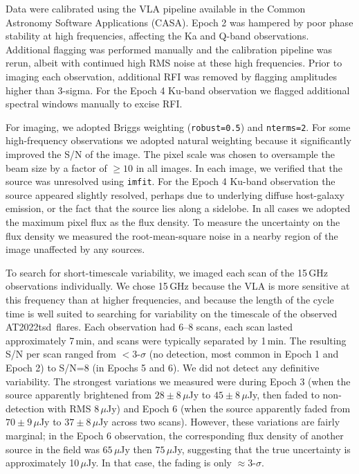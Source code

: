 \documentclass{nature_plusfigure}
\newcommand{\at}{AT2022tsd}
\begin{document}
\begin{methods}
Data were calibrated using the VLA pipeline available in the Common Astronomy Software Applications (CASA\cite{McMullin2007}).
Epoch 2 was hampered by poor phase stability at high frequencies, affecting the Ka and Q-band observations. Additional flagging was performed manually and the calibration pipeline was rerun, albeit with continued high RMS noise at these high frequencies.
Prior to imaging each observation, additional RFI was removed by flagging amplitudes higher than 3-sigma.
For the Epoch 4 Ku-band observation we flagged additional spectral windows manually to excise RFI.

For imaging, we adopted Briggs weighting (\texttt{robust=0.5}) and \texttt{nterms=2}. For some high-frequency observations we adopted natural weighting because it significantly improved the S/N of the image.
The pixel scale was chosen to oversample the beam size by a factor of $\geq10$ in all images.
In each image, we verified that the source was unresolved using \texttt{imfit}.
For the Epoch 4 Ku-band observation the source appeared slightly resolved, perhaps due to underlying diffuse host-galaxy emission, or the fact that the source lies along a sidelobe.
In all cases we adopted the maximum pixel flux as the flux density.
To measure the uncertainty on the flux density we measured the root-mean-square noise in a nearby region of the image unaffected by any sources.

To search for short-timescale variability, we imaged each scan of the 15\,GHz observations individually. We chose 15\,GHz because the VLA is more sensitive at this frequency than at higher frequencies, and because the length of the cycle time is well suited to searching for variability on the timescale of the observed \at\ flares. Each observation had 6--8 scans, each scan lasted approximately 7\,min, and scans were typically separated by 1\,min. The resulting S/N per scan ranged from $<3$-$\sigma$ (no detection, most common in Epoch 1 and Epoch 2) to S/N=8 (in Epochs 5 and 6).
We did not detect any definitive variability. The strongest variations we measured were during Epoch 3 (when the source apparently brightened from $28\pm8\,\mu$Jy to $45\pm8\,\mu$Jy, then faded to non-detection with RMS $8\,\mu$Jy) and Epoch 6 (when the source apparently faded from $70\pm9\,\mu$Jy to $37\pm8\,\mu$Jy across two scans). However, these variations are fairly marginal; in the Epoch 6 observation, the corresponding flux density of another source in the field was $65\,\mu$Jy then $75\,\mu$Jy, suggesting that the true uncertainty is approximately 10$\,\mu$Jy. In that case, the fading is only $\approx3$-$\sigma$.


\end{methods}
\end{document}
